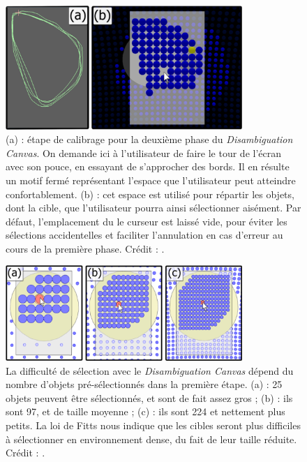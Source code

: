 \begin{appendices}
	
	\begin{figure}[!htbp]
		\centering
		\includegraphics[width=0.8\textwidth]{figures/ch2/dCanvasLayout}
		\caption[\emph{Disambiguation Canvas} -- calibrage]{(a) : étape de calibrage pour la deuxième phase du \emph{Disambiguation Canvas}. On demande ici à l'utilisateur de faire le tour de l'écran avec son pouce, en essayant de s'approcher des bords. Il en résulte un motif fermé représentant l'espace que l'utilisateur peut atteindre confortablement. (b) : cet espace est utilisé pour répartir les objets, dont la cible, que l'utilisateur pourra ainsi sélectionner aisément. Par défaut, l'emplacement du le curseur est laissé vide, pour éviter les sélections accidentelles et faciliter l'annulation en cas d'erreur au cours de la première phase. Crédit : \cite{debarba2013disambiguation}.}
		\label{fig:dCanvasLayout}
	\end{figure}
	

	\begin{figure}[!htbp]
		\centering
		\includegraphics[width=0.80\textwidth]{figures/ch2/dCanvasDensity}
		\caption[\emph{Disambiguation Canvas} -- densité]{La difficulté de sélection avec le \emph{Disambiguation Canvas} dépend du nombre d'objets pré-sélectionnés dans la première étape. (a) : 25 objets peuvent être sélectionnés, et sont de fait assez gros ; (b) : ils sont 97, et de taille moyenne ; (c) : ils sont 224 et nettement plus petits. La loi de Fitts nous indique que les cibles seront plus difficiles à sélectionner en environnement dense, du fait de leur taille réduite. Crédit : \cite{debarba2013disambiguation}.}
		\label{fig:dCanvasDensity}
	\end{figure}
	

\end{appendices}
